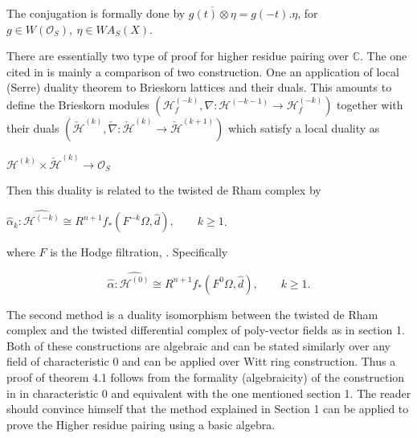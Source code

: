\documentclass[12pt,twoside]{amsart}
\begin{document}
\vspace{0.5cm}

\noindent
The conjugation is formally done by $\overline{g(t) \otimes \eta}=g(-t). \eta$, for $g \in W(\mathcal{O}_S),\ \eta \in WA_S(X)$. 

\vspace{0.5cm}

\noindent
There are essentially two type of proof for higher residue pairing over $\mathbb{C}$. The one cited in \cite{SA1} is mainly a comparison of two construction. One an application of local (Serre) duality theorem to Brieskorn lattices and their duals. This amounts to define the Brieskorn modules $(\mathcal{H}_f^{(-k)}, \nabla:\mathcal{H}^{(-k-1)} \to \mathcal{H}_f^{(-k)})$ together with their duals $(\check{\mathcal{H}}^{(k)}, \check{\nabla}: \check{\mathcal{H}}^{(k)} \to  \check{\mathcal{H}}^{(k+1)})$ which satisfy a local duality as 

\vspace{0.5cm}

\begin{center}
$\mathcal{H}^{(k)} \times \check{\mathcal{H}}^{(k)} \to \mathcal{O}_S$
\end{center}

\vspace{0.5cm}

\noindent
Then this duality is related to the twisted de Rham complex by 

\vspace{0.5cm}

\begin{center}
$\hat{\alpha}_k: \widehat{\mathcal{H}^{(-k)}} \cong R^{n+1}f_*(F^{-k}\Omega, \hat{d}), \qquad k \geq 1$.
\end{center}

\vspace{0.5cm}

\noindent
where $F$ is the Hodge filtration, \cite{S1}. Specifically

\begin{equation}
\hat{\alpha}: \widehat{\mathcal{H}^{(0)}} \cong R^{n+1}f_*(F^{0}\Omega, \hat{d}), \qquad k \geq 1.
\end{equation}

\vspace{0.5cm}

\noindent
The second method is a duality isomorphism between the twisted de Rham complex and the twisted differential complex of poly-vector fields as in section 1. Both of these constructions are algebraic and can be stated similarly over any field of characteristic $0$ and can be applied over Witt ring construction. Thus a proof of theorem 4.1 follows from the formality (algebraicity) of the construction in \cite{SA1} in characteristic $0$ and equivalent with the one mentioned section 1. The reader should convince himself that the method explained in Section 1 can be applied to prove the Higher residue pairing using a basic algebra.
\end{document}
